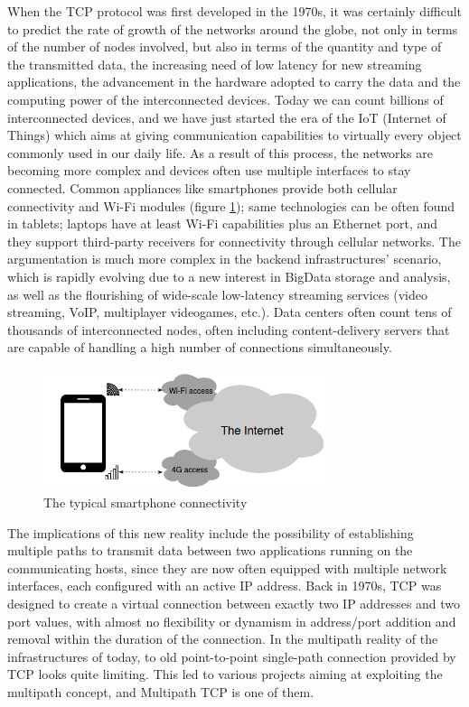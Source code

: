 When the TCP protocol was first developed in the 1970s, it was certainly difficult to predict the rate of growth of the networks around the globe, not only in terms of the number of nodes involved, but also in terms of the quantity and type of the transmitted data, the increasing need of low latency for new streaming applications, the advancement in the hardware adopted to carry the data and the computing power of the interconnected devices. Today we can count billions of interconnected devices, and we have just started the era of the IoT (Internet of Things) which aims at giving communication capabilities to virtually every object commonly used in our daily life.
As a result of this process, the networks are becoming more complex and devices often use multiple interfaces to stay connected. Common appliances like smartphones provide both cellular connectivity and Wi-Fi modules (figure \ref{fig:smartphones}); same technologies can be often found in tablets; laptops have at least Wi-Fi capabilities plus an Ethernet port, and they support third-party receivers for connectivity through cellular networks. The argumentation is much more complex in the backend infrastructures' scenario, which is rapidly evolving due to a new interest in BigData storage and analysis, as well as the flourishing of wide-scale low-latency streaming services (video streaming, VoIP, multiplayer videogames, etc.). Data centers often count tens of thousands of interconnected nodes, often including content-delivery servers that are capable of handling a high number of connections simultaneously.

\begin{figure}[!htb]
\centering
\includegraphics[width=0.75\textwidth]{images/smartphones}
\caption{The typical smartphone connectivity}
\label{fig:smartphones}
\end{figure}

The implications of this new reality include the possibility of establishing multiple paths to transmit data between two applications running on the communicating hosts, since they are now often equipped with multiple network interfaces, each configured with an active IP address. Back in 1970s, TCP was designed to create a virtual connection between exactly two IP addresses and two port values, with almost no flexibility or dynamism in address/port addition and removal within the duration of the connection. In the multipath reality of the infrastructures of today, to old point-to-point single-path connection provided by TCP looks quite limiting. This led to various projects aiming at exploiting the multipath concept, and Multipath TCP is one of them.


